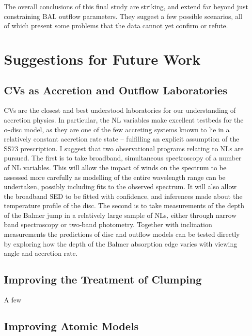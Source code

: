 The overall conclusions of this final study are striking, and extend far 
beyond just constraining BAL outflow parameters. 
They suggest a few possible scenarios, all of which present some problems
that the data cannot yet confirm or refute.





\section{Suggestions for Future Work}

\subsection{CVs as Accretion and Outflow Laboratories}

CVs are the closest and best understood laboratories for
our understanding of accretion physics. In particular, the NL
variables make excellent testbeds for the $\alpha$-disc model,
as they are one of the few accreting systems known to
lie in a relatively constant accretion rate state -- fulfilling 
an explicit assumption of the SS73 prescription. I suggest
that two observational programs relating to NLs are pursued.
The first is to take broadband, simultaneous spectroscopy of a number
of NL variables. This will allow the impact of winds on the spectrum
to be assessed more carefully as modelling of the entire wavelength
range can be undertaken, possibly including fits to the observed spectrum.
It will also allow the broadband SED to be fitted with confidence,
and inferences made about the temperature profile of the disc. 
The second is to take measurements of the depth of the Balmer jump
in a relatively large sample of NLs, either through narrow band spectroscopy
or two-band photometry. Together with inclination measurements the predictions
of disc and outflow models can be tested directly by exploring how the depth
of the Balmer absorption edge varies with viewing angle and accretion rate.

\subsection{Improving the Treatment of Clumping}

A few 

\subsection{Improving Atomic Models}


